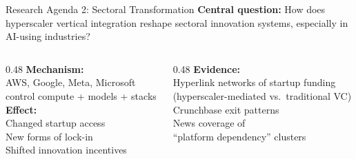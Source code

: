 \documentclass[aspectratio=169,12pt]{beamer}
\begin{document}
\begin{frame}{Research Agenda 2: Sectoral Transformation}
\small\textbf{Central question:} How does hyperscaler vertical integration reshape
sectoral innovation systems, especially in AI-using industries?\\[0.5em]
\begin{columns}[T]
\begin{column}{0.48\textwidth}
  \footnotesize
  \textbf{Mechanism:}\\
  AWS, Google, Meta, Microsoft\\
  control compute + models + stacks\\[0.4em]
  \textbf{Effect:}\\
  Changed startup access\\
  New forms of lock-in\\
  Shifted innovation incentives
\end{column}
\begin{column}{0.48\textwidth}
  \footnotesize
  \textbf{Evidence:}\\
  Hyperlink networks of startup funding\\
  (hyperscaler-mediated vs.\ traditional VC)\\[0.3em]
  Crunchbase exit patterns\\[0.3em]
  News coverage of\\
  ``platform dependency'' clusters
\end{column}
\end{columns}
\end{frame}
\end{document}
